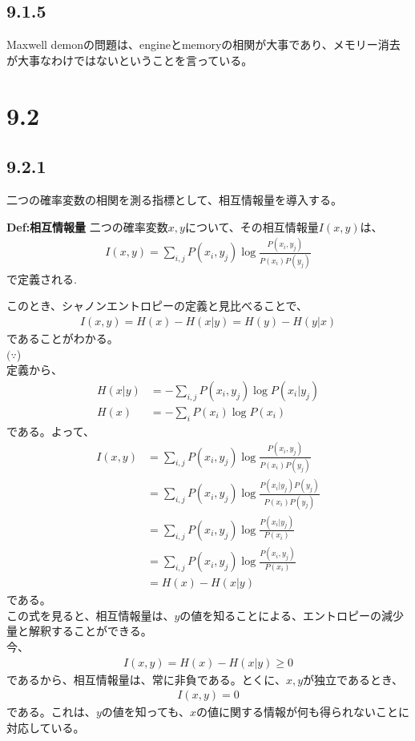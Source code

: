 \documentclass[a4paper,11pt]{jsarticle}
\numberwithin{equation}{section}
\begin{document}
\subsection*{9.1.5}
Maxwell demonの問題は、engineとmemoryの相関が大事であり、メモリー消去が大事なわけではないということを言っている。

\section*{9.2}
\subsection*{9.2.1}
二つの確率変数の相関を測る指標として、相互情報量を導入する。\\
\begin{itembox}[l]{\textbf{Def:相互情報量}}
    二つの確率変数$x,y$について、その相互情報量$I(x,y)$は、
    \begin{align}
        I(x,y) = \sum_{i,j}P(x_i,y_j)\log\frac{P(x_i,y_j)}{P(x_i)P(y_j)}
    \end{align}
    で定義される.

\end{itembox}
このとき、シャノンエントロピーの定義と見比べることで、
\begin{align}
    I(x,y) = H(x) - H(x|y) = H(y) - H(y|x)
\end{align}
であることがわかる。\\%
$(\because$)\\
定義から、
\begin{align}
    H(x|y) &= -\sum_{i,j}P(x_i,y_j)\log P(x_i|y_j) \\
    H(x) &= -\sum_{i}P(x_i)\log P(x_i)
\end{align}
である。よって、
\begin{align}
    I(x,y) &= \sum_{i,j}P(x_i,y_j)\log\frac{P(x_i,y_j)}{P(x_i)P(y_j)} \\
    &= \sum_{i,j}P(x_i,y_j)\log \frac{P(x_i|y_j)P(y_j)}{P(x_i)P(y_j)} \\
    &= \sum_{i,j}P(x_i,y_j)\log \frac{P(x_i|y_j)}{P(x_i)} \\
    &= \sum_{i,j}P(x_i,y_j)\log \frac{P(x_i,y_j)}{P(x_i)} \\
    &= H(x) - H(x|y)
\end{align}
である。\hfill\qedsymbol\\
この式を見ると、相互情報量は、$y$の値を知ることによる、エントロピーの減少量と解釈することができる。\\
今、
\begin{align}
    I(x,y) = H(x) - H(x|y) \geq 0
\end{align}
であるから、相互情報量は、常に非負である。とくに、$x,y$が独立であるとき、
\begin{align}
    I(x,y) = 0
\end{align}
である。これは、$y$の値を知っても、$x$の値に関する情報が何も得られないことに対応している。\\
\end{document}

